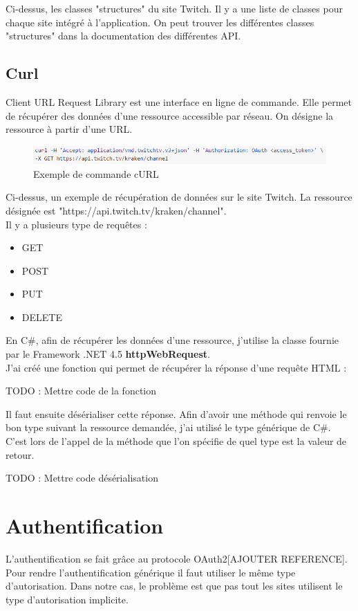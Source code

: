 \documentclass[11pt]{report} %
\begin{document}
		Ci-dessus, les classes "structures" du site Twitch. Il y a une liste de classes pour chaque site intégré à l'application. On peut trouver les différentes classes "structures" dans la documentation des différentes API.
		
		\subsection{Curl}
		Client URL Request Library est une interface en ligne de commande. Elle permet de récupérer des données d'une ressource accessible par réseau. On désigne la ressource à partir d'une URL.
		
		\begin{figure}[h]
			\center
			\includegraphics[width=1\textwidth]{../img/curl.png}
			\caption{Exemple de commande cURL}
			\label{cURL command}
		\end{figure}
		
		Ci-dessus, un exemple de récupération de données sur le site Twitch. La ressource désignée est "https://api.twitch.tv/kraken/channel".\\
		
		Il y a plusieurs type de requêtes :
		\begin{itemize}
			\item GET
			\item POST
			\item PUT
			\item DELETE
		\end{itemize}
		
		En C\#, afin de récupérer les données d'une ressource, j'utilise la classe fournie par le Framework .NET 4.5 \textbf{httpWebRequest}.\\		
		J'ai créé une fonction qui permet de récupérer la réponse d'une requête HTML :
		
		TODO : Mettre code de la fonction
		
		Il faut ensuite désérialiser cette réponse. Afin d’avoir une méthode qui renvoie le bon type suivant la ressource demandée, j’ai utilisé le type générique de C\#. C'est lors de l'appel de la méthode que l'on spécifie de quel type est la valeur de retour.
		
		TODO : Mettre code désérialisation 
		
	
	\section{Authentification}
	L'authentification se fait grâce au protocole OAuth2[AJOUTER REFERENCE]. Pour rendre l'authentification générique il faut utiliser le même type d'autorisation. Dans notre cas, le problème est que pas tout les sites utilisent le type d'autorisation implicite.
	
\end{document}
